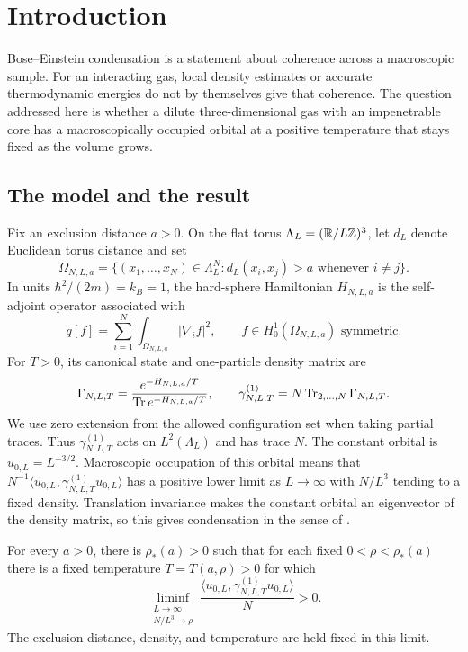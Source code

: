 \section{Introduction}\label{sec:introduction}

Bose--Einstein condensation is a statement about coherence across a
macroscopic sample. For an interacting gas, local density estimates or
accurate thermodynamic energies do not by themselves give that coherence.
The question addressed here is whether a dilute three-dimensional gas
with an impenetrable core has a macroscopically occupied orbital at a
positive temperature that stays fixed as the volume grows.

\subsection{The model and the result}

Fix an exclusion distance $a>0$. On the flat torus
$\Lambda_L=(\mathbb R/L\mathbb Z)^3$, let $d_L$ denote Euclidean torus distance and set
\[
 \Omega_{N,L,a}
 =\{(x_1,\ldots,x_N)\in\Lambda_L^N:
                   d_L(x_i,x_j)>a\text{ whenever }i\ne j\}.
\]
In units $\hbar^2/(2m)=k_B=1$, the hard-sphere Hamiltonian
$H_{N,L,a}$ is the self-adjoint operator associated with
\[
 q[f]=\sum_{i=1}^N\int_{\Omega_{N,L,a}}|\nabla_i f|^2,
 \qquad f\in H^1_0(\Omega_{N,L,a})\text{ symmetric}.
\]
For $T>0$, its canonical state and one-particle density matrix are
\[
 \Gamma_{N,L,T}=
 \frac{e^{-H_{N,L,a}/T}}{\operatorname{Tr} e^{-H_{N,L,a}/T}},\qquad
 \gamma^{(1)}_{N,L,T}=N\operatorname{Tr}_{2,\ldots,N}\Gamma_{N,L,T}.
\]
We use zero extension from the allowed configuration set when taking
partial traces. Thus $\gamma^{(1)}_{N,L,T}$ acts on $L^2(\Lambda_L)$
and has trace $N$. The constant orbital is $u_{0,L}=L^{-3/2}$.
Macroscopic occupation of this orbital means that
$N^{-1}\langle u_{0,L},\gamma^{(1)}_{N,L,T}u_{0,L}\rangle$ has a
positive lower limit as $L\to\infty$ with $N/L^3$ tending to a fixed
density. Translation invariance makes the constant orbital an eigenvector
of the density matrix, so this gives condensation in the sense of
\citet{PenroseOnsager1956}.

\begin{theorem}\label{thm:main}
For every $a>0$, there is $\rho_*(a)>0$ such that for each fixed
$0<\rho<\rho_*(a)$ there is a fixed temperature $T=T(a,\rho)>0$ for which
\[
 \liminf_{\substack{L\to\infty\\N/L^3\to\rho}}
 \frac{\langle u_{0,L},\gamma^{(1)}_{N,L,T}u_{0,L}\rangle}{N}>0.
\]
The exclusion distance, density, and temperature are held fixed in this
limit.
\end{theorem}


